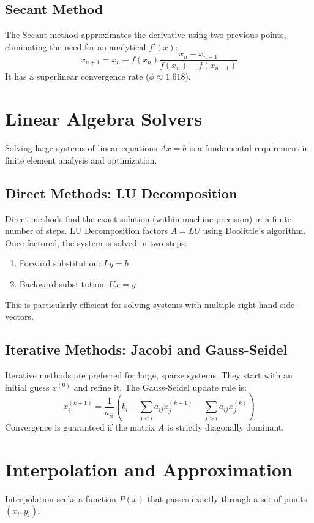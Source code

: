 \documentclass[11pt,a4paper]{article}
\begin{document}
\subsection{Secant Method}
The Secant method approximates the derivative using two previous points, eliminating the need for an analytical $f'(x)$:
\begin{equation}
    x_{n+1} = x_n - f(x_n) \frac{x_n - x_{n-1}}{f(x_n) - f(x_{n-1})}
\end{equation}
It has a superlinear convergence rate ($\phi \approx 1.618$).

\section{Linear Algebra Solvers}
Solving large systems of linear equations $Ax = b$ is a fundamental requirement in finite element analysis and optimization.

\subsection{Direct Methods: LU Decomposition}
Direct methods find the exact solution (within machine precision) in a finite number of steps. LU Decomposition factors $A = LU$ using Doolittle's algorithm. Once factored, the system is solved in two steps:
\begin{enumerate}
    \item Forward substitution: $Ly = b$
    \item Backward substitution: $Ux = y$
\end{enumerate}
This is particularly efficient for solving systems with multiple right-hand side vectors.

\subsection{Iterative Methods: Jacobi and Gauss-Seidel}
Iterative methods are preferred for large, sparse systems. They start with an initial guess $x^{(0)}$ and refine it. The Gauss-Seidel update rule is:
\begin{equation}
    x_i^{(k+1)} = \frac{1}{a_{ii}} \left( b_i - \sum_{j < i} a_{ij} x_j^{(k+1)} - \sum_{j > i} a_{ij} x_j^{(k)} \right)
\end{equation}
Convergence is guaranteed if the matrix $A$ is strictly diagonally dominant.

\section{Interpolation and Approximation}
Interpolation seeks a function $P(x)$ that passes exactly through a set of points $(x_i, y_i)$.
\end{document}
